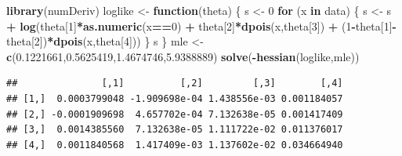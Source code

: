 \documentclass[
]{article}
\newenvironment{Shaded}{\begin{snugshade}}{\end{snugshade}}
\newcommand{\ControlFlowTok}[1]{\textcolor[rgb]{0.13,0.29,0.53}{\textbf{#1}}}
\newcommand{\DecValTok}[1]{\textcolor[rgb]{0.00,0.00,0.81}{#1}}
\newcommand{\FloatTok}[1]{\textcolor[rgb]{0.00,0.00,0.81}{#1}}
\newcommand{\FunctionTok}[1]{\textcolor[rgb]{0.13,0.29,0.53}{\textbf{#1}}}
\newcommand{\NormalTok}[1]{#1}
\newcommand{\OtherTok}[1]{\textcolor[rgb]{0.56,0.35,0.01}{#1}}
\newcommand{\SpecialCharTok}[1]{\textcolor[rgb]{0.81,0.36,0.00}{\textbf{#1}}}
\begin{document}
\begin{Shaded}
\begin{Highlighting}[]
\FunctionTok{library}\NormalTok{(numDeriv)}
\NormalTok{loglike }\OtherTok{\textless{}{-}} \ControlFlowTok{function}\NormalTok{(theta)}
\NormalTok{\{}
\NormalTok{  s }\OtherTok{\textless{}{-}} \DecValTok{0}
  \ControlFlowTok{for}\NormalTok{ (x }\ControlFlowTok{in}\NormalTok{ data)}
\NormalTok{  \{}
\NormalTok{    s }\OtherTok{\textless{}{-}}\NormalTok{ s }\SpecialCharTok{+} \FunctionTok{log}\NormalTok{(theta[}\DecValTok{1}\NormalTok{]}\SpecialCharTok{*}\FunctionTok{as.numeric}\NormalTok{(x}\SpecialCharTok{==}\DecValTok{0}\NormalTok{) }\SpecialCharTok{+}
\NormalTok{                 theta[}\DecValTok{2}\NormalTok{]}\SpecialCharTok{*}\FunctionTok{dpois}\NormalTok{(x,theta[}\DecValTok{3}\NormalTok{]) }\SpecialCharTok{+}
\NormalTok{                 (}\DecValTok{1}\SpecialCharTok{{-}}\NormalTok{theta[}\DecValTok{1}\NormalTok{]}\SpecialCharTok{{-}}\NormalTok{theta[}\DecValTok{2}\NormalTok{])}\SpecialCharTok{*}\FunctionTok{dpois}\NormalTok{(x,theta[}\DecValTok{4}\NormalTok{]))}
\NormalTok{  \}}
\NormalTok{  s}
\NormalTok{\}}
\NormalTok{mle }\OtherTok{\textless{}{-}} \FunctionTok{c}\NormalTok{(}\FloatTok{0.1221661}\NormalTok{,}\FloatTok{0.5625419}\NormalTok{,}\FloatTok{1.4674746}\NormalTok{,}\FloatTok{5.9388889}\NormalTok{)}
\FunctionTok{solve}\NormalTok{(}\SpecialCharTok{{-}}\FunctionTok{hessian}\NormalTok{(loglike,mle))}
\end{Highlighting}
\end{Shaded}

\begin{verbatim}
##               [,1]          [,2]         [,3]        [,4]
## [1,]  0.0003799048 -1.909698e-04 1.438556e-03 0.001184057
## [2,] -0.0001909698  4.657702e-04 7.132638e-05 0.001417409
## [3,]  0.0014385560  7.132638e-05 1.111722e-02 0.011376017
## [4,]  0.0011840568  1.417409e-03 1.137602e-02 0.034664940
\end{verbatim}
\end{document}
